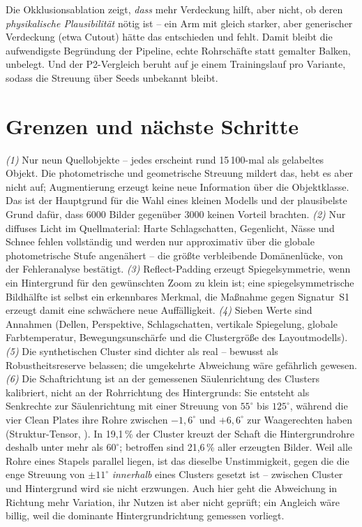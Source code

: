  Die Okklusionsablation
zeigt, \emph{dass} mehr Verdeckung hilft, aber nicht, ob deren
\emph{physikalische Plausibilität} nötig ist -- ein Arm mit gleich starker, aber
generischer Verdeckung (etwa Cutout) hätte das entschieden und fehlt. Damit
bleibt die aufwendigste Begründung der Pipeline, echte Rohrschäfte statt gemalter
Balken, unbelegt. Und der P2-Vergleich beruht auf je einem Trainingslauf pro
Variante, sodass die Streuung über Seeds unbekannt bleibt.

\section{Grenzen und nächste Schritte}
\label{sec:grenzen}

 \emph{(1)} Nur neun Quellobjekte -- jedes
erscheint rund 15\,100-mal als gelabeltes Objekt. Die photometrische und
geometrische Streuung mildert das, hebt es aber nicht auf; Augmentierung erzeugt
keine neue Information über die Objektklasse. Das ist der Hauptgrund für die
Wahl eines kleinen Modells und der plausibelste Grund dafür, dass 6000 Bilder
gegenüber 3000 keinen Vorteil brachten. \emph{(2)} Nur diffuses Licht im
Quellmaterial: Harte Schlagschatten, Gegenlicht, Nässe und Schnee fehlen
vollständig und werden nur approximativ über die globale photometrische Stufe
angenähert -- die größte verbleibende Domänenlücke, von der Fehleranalyse
bestätigt. \emph{(3)} Reflect-Padding erzeugt Spiegelsymmetrie, wenn ein
Hintergrund für den gewünschten Zoom zu klein ist; eine spiegelsymmetrische
Bildhälfte ist selbst ein erkennbares Merkmal, die Maßnahme gegen Signatur~S1
erzeugt damit eine schwächere neue Auffälligkeit. \emph{(4)} Sieben Werte sind
Annahmen (Dellen, Perspektive, Schlagschatten, vertikale Spiegelung, globale
Farbtemperatur, Bewegungsunschärfe und die Clustergröße des Layoutmodells). \emph{(5)} Die synthetischen Cluster sind
dichter als real -- bewusst als Robustheitsreserve belassen; die umgekehrte
Abweichung wäre gefährlich gewesen. \emph{(6)} Die Schaftrichtung ist an der
gemessenen Säulenrichtung des Clusters kalibriert, nicht an der Rohrrichtung des
Hintergrunds: Sie entsteht als Senkrechte zur Säulenrichtung mit einer Streuung
von $55^\circ$ bis $125^\circ$, während die vier Clean Plates ihre Rohre
zwischen $-1{,}6^\circ$ und $+6{,}6^\circ$ zur Waagerechten haben
(Struktur-Tensor, ). In 19,1\,\% der Cluster kreuzt der
Schaft die Hintergrundrohre deshalb unter mehr als $60^\circ$; betroffen sind
21,6\,\% aller erzeugten Bilder. Weil alle Rohre eines Stapels parallel liegen,
ist das dieselbe Unstimmigkeit, gegen die die enge Streuung von $\pm11^\circ$
\emph{innerhalb} eines Clusters gesetzt ist -- zwischen Cluster und Hintergrund
wird sie nicht erzwungen. Auch hier geht die Abweichung in Richtung mehr
Variation, ihr Nutzen ist aber nicht geprüft; ein Angleich wäre billig, weil die
dominante Hintergrundrichtung gemessen vorliegt.

